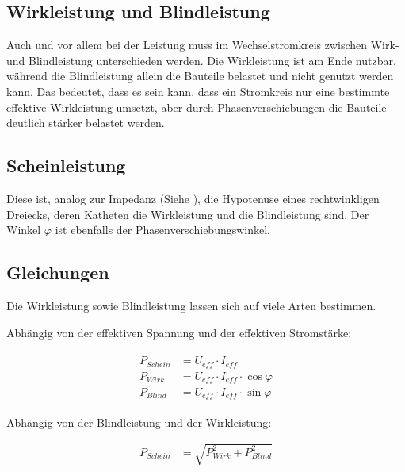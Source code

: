 

\subsection{Wirkleistung und Blindleistung}

Auch und vor allem bei der Leistung muss im Wechselstromkreis zwischen Wirk- und Blindleistung unterschieden werden. Die Wirkleistung ist am Ende nutzbar, während die Blindleistung allein die Bauteile belastet und nicht genutzt werden kann. Das bedeutet, dass es sein kann, dass ein Stromkreis nur eine bestimmte effektive Wirkleistung umsetzt, aber durch Phasenverschiebungen die Bauteile deutlich stärker belastet werden.


\subsection{Scheinleistung}

Diese ist, analog zur Impedanz (Siehe ), die Hypotenuse eines rechtwinkligen Dreiecks, deren Katheten die Wirkleistung und die Blindleistung sind. Der Winkel $\varphi$ ist ebenfalls der Phasenverschiebungswinkel.


\subsection{Gleichungen}

Die Wirkleistung sowie Blindleistung lassen sich auf viele Arten bestimmen.

\noindent Abhängig von der effektiven Spannung und der effektiven Stromstärke:

\begin{align}		\label{eq:ScheinleistungUI}
\begin{split}
	P_{Schein} &= U_{eff} \cdot I_{eff}						\\
	P_{Wirk}   &= U_{eff} \cdot I_{eff} \cdot \cos \varphi	\\
	P_{Blind}  &= U_{eff} \cdot I_{eff} \cdot \sin \varphi	
\end{split}
\end{align}

\noindent Abhängig von der Blindleistung und der Wirkleistung:

\begin{align}		\label{eq:ScheinleistungPP}
	P_{Schein}  &= \sqrt{P_{Wirk}^2 + P_{Blind}^2}
\end{align}




